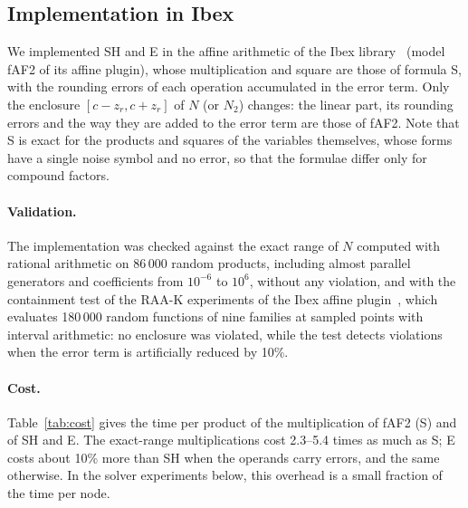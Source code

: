 \documentclass[10pt]{article}
\theoremstyle{definition}
\begin{document}
\subsection{Implementation in Ibex}
\label{sec:ibex}

We implemented SH and E in the affine arithmetic of the Ibex library~\cite{chabert2009,ibexaffine} (model fAF2 of its affine plugin), whose multiplication and square are those of formula S, with the rounding errors of each operation accumulated in the error term. Only the enclosure $[c-z_r,c+z_r]$ of $N$ (or $N_2$) changes: the linear part, its rounding errors and the way they are added to the error term are those of fAF2. Note that S is exact for the products and squares of the variables themselves, whose forms have a single noise symbol and no error, so that the formulae differ only for compound factors.

\paragraph{Validation.} The implementation was checked against the exact range of $N$ computed with rational arithmetic on 86\,000 random products, including almost parallel generators and coefficients from $10^{-6}$ to $10^6$, without any violation, and with the containment test of the RAA-K experiments of the Ibex affine plugin~\cite{ibexaffine}, which evaluates 180\,000 random functions of nine families at sampled points with interval arithmetic: no enclosure was violated, while the test detects violations when the error term is artificially reduced by 10\%.

\paragraph{Cost.} Table~\ref{tab:cost} gives the time per product of the multiplication of fAF2 (S) and of SH and E. The exact-range multiplications cost 2.3--5.4 times as much as S; E costs about 10\% more than SH when the operands carry errors, and the same otherwise. In the solver experiments below, this overhead is a small fraction of the time per node.

\begin{table}[H]
\centering
\caption{Time per product ($\mu$s) in the affine arithmetic of Ibex, for random forms with $n$ noise symbols, with and without error terms in the operands (C++, \texttt{-O2}, one core).}
\label{tab:cost}
\small

\end{table}
\end{document}
